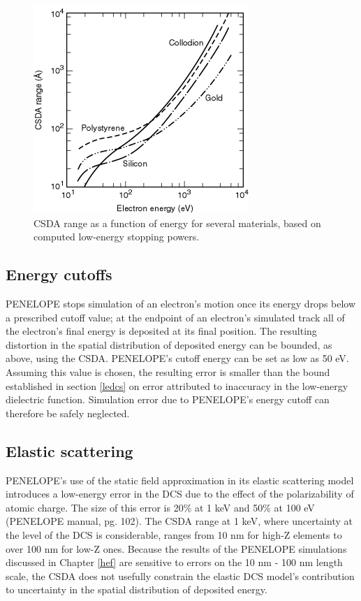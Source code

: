 \documentclass [11pt, proquest, article] {uwthesis}[2016/11/22]
\begin{document}
\begin{figure}[h] 
\caption{CSDA range as a function of energy for several materials, based on computed low-energy stopping powers. }
\label{fig:csda}
\centering
\includegraphics[scale=0.7]{../Figures/csda.png}
\end{figure}

\subsection{Energy cutoffs} \label{cutoffs}
PENELOPE stops simulation of an electron's motion once its energy drops below a prescribed cutoff value; at the endpoint of an electron's simulated track all of the electron's final energy is deposited at its final position. The resulting distortion in the spatial distribution of deposited energy can be bounded, as above, using the CSDA. PENELOPE's cutoff energy can be set as low as 50 eV. Assuming this value is chosen, the resulting error is smaller than the bound established in section \ref{ledcs} on error attributed to inaccuracy in the low-energy dielectric function. Simulation error due to PENELOPE's energy cutoff can therefore be safely neglected.

\subsection{Elastic scattering}
PENELOPE's use of the static field approximation in its elastic scattering model introduces a low-energy error in the DCS due to the effect of the polarizability of atomic charge.\cite{salvat2003optical} The size of this error is 20\% at 1 keV and 50\% at 100 eV (PENELOPE manual, pg. 102). The CSDA range at 1 keV, where uncertainty at the level of the DCS is considerable, ranges from 10 nm for high-Z elements to over 100 nm for low-Z ones. Because the results of the PENELOPE simulations discussed in Chapter \ref{hef}  are sensitive to errors on the 10 nm - 100 nm length scale, the CSDA does not usefully constrain the elastic DCS model's contribution to uncertainty in the spatial distribution of deposited energy. 
\end{document}

